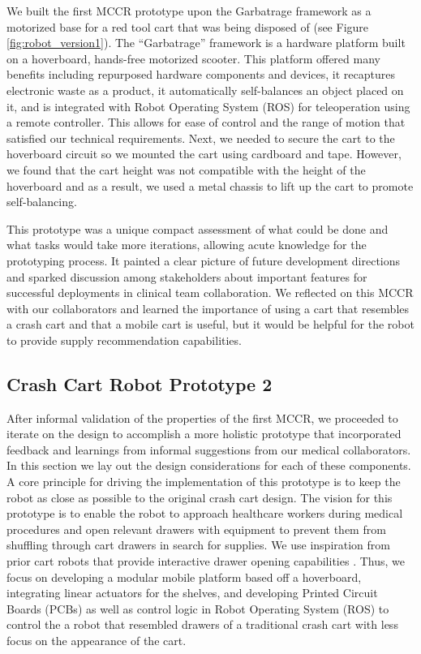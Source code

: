 We built the first MCCR prototype upon the Garbatrage framework \cite{mandel2023recapturing} as a motorized base for a red tool cart that was being disposed of (see Figure \ref{fig:robot_version1}). 
The “Garbatrage” framework is a hardware platform built on a hoverboard, hands-free motorized scooter.
This platform offered many benefits including repurposed hardware components and devices, it recaptures electronic waste as a product, it automatically self-balances an object placed on it, and is integrated with Robot Operating System (ROS) for teleoperation using a remote controller.
This allows for ease of control and the range of motion that satisfied our technical requirements. 
Next, we needed to secure the cart to the hoverboard circuit so we mounted the cart using cardboard and tape.
However, we found that the cart height was not compatible with the height of the hoverboard and as a result, we used a metal chassis to lift up the cart to promote self-balancing.


This prototype was a unique compact assessment of what could be done and what tasks would take more iterations, allowing acute knowledge for the prototyping process. 
It painted a clear picture of future development directions and sparked discussion among stakeholders about important features for successful deployments in clinical team collaboration. 
We reflected on this MCCR with our collaborators and learned the importance of using a cart that resembles a crash cart and that a mobile cart is useful, but it would be helpful for the robot to provide supply recommendation capabilities.







\subsection{Crash Cart Robot Prototype 2}

After informal validation of the properties of the first MCCR, we proceeded to iterate on the design to accomplish a more holistic prototype that incorporated feedback and learnings from informal suggestions from our medical collaborators. 
In this section we lay out the design considerations for each of these components. 
A core principle for driving the implementation of this prototype is to keep the robot as close as possible to the original crash cart design. 
The vision for this prototype is to enable the robot to approach healthcare workers during medical procedures and open relevant drawers with equipment to prevent them from shuffling through cart drawers in search for supplies.
We use inspiration from prior cart robots that provide interactive drawer opening capabilities \cite{mok2015place}.
Thus, we focus on developing a modular mobile platform based off a hoverboard, integrating linear actuators for the shelves, and developing Printed Circuit Boards (PCBs) as well as control logic in Robot Operating System (ROS) to control the a robot that resembled drawers of a traditional crash cart with less focus on the appearance of the cart.

